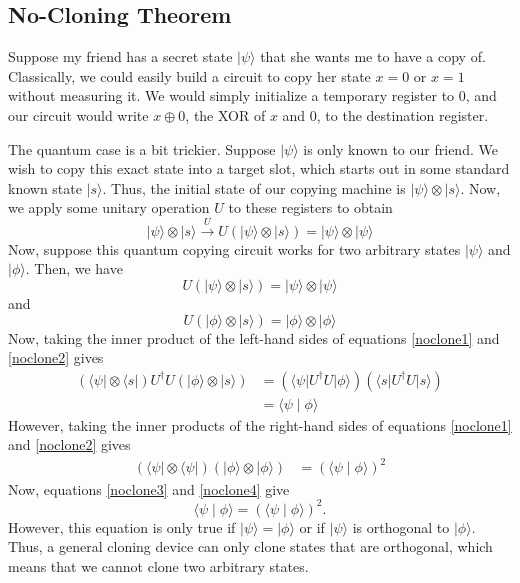 \documentclass[12pt,twoside]{reedthesis}
\theoremstyle{definition}
\newlength{\arrow}
\newcommand{\ket}[1]{\ensuremath{\lvert #1\rangle}\xspace}
\newcommand{\bra}[1]{\ensuremath{\langle #1\vert}\xspace}
\newcommand{\inner}[2]{\ensuremath{\langle #1 \mid #2 \rangle}\xspace}
\begin{document}
\subsection{No-Cloning Theorem}

Suppose my friend has a secret state \ket{\psi} that she wants me to have a copy of.  Classically, we could easily build a circuit to copy her state $x = 0$ or $x = 1$ without measuring it. We would simply initialize a temporary register to 0, and our circuit would write $x \oplus 0$, the XOR of $x$ and 0, to the destination register. 

The quantum case is a bit trickier. Suppose \ket{\psi} is only known to our friend. We wish to copy this exact state into a target slot, which starts out in some standard known state \ket{s}. Thus, the initial state of our copying machine is $\ket{\psi} \otimes \ket{s}$. Now, we apply some unitary operation $U$ to these registers to obtain
\begin{equation}
\ket{\psi} \otimes \ket{s} \xrightarrow{U} U(\ket{\psi} \otimes \ket{s}) = \ket{\psi} \otimes \ket{\psi}
\end{equation}
Now, suppose this quantum copying circuit works for two arbitrary states \ket{\psi} and \ket{\phi}. Then, we have
\begin{equation} \label{noclone1}
U(\ket{\psi} \otimes \ket{s}) = \ket{\psi} \otimes \ket{\psi}
\end{equation}
and
\begin{equation} \label{noclone2}
U(\ket{\phi} \otimes \ket{s}) = \ket{\phi} \otimes \ket{\phi}
\end{equation}
Now, taking the inner product of the left-hand sides of equations \ref{noclone1} and \ref{noclone2} gives
\begin{align} 
(\bra{\psi} \otimes \bra{s})U^{\dagger}U (\ket{\phi} \otimes \ket{s})
& = (\bra{\psi} U^\dagger U \ket{\phi})(\bra{s} U^\dagger U \ket{s}) \\
& = \inner{\psi}{\phi} \label{noclone3}
\end{align}
However, taking the inner products of the right-hand sides of equations \ref{noclone1} and \ref{noclone2} gives
\begin{align} \label{noclone4}
(\bra{\psi} \otimes \bra{\psi})(\ket{\phi} \otimes \ket{\phi})
& = (\inner{\psi}{\phi})^2
\end{align}
Now, equations \ref{noclone3} and \ref{noclone4} give
\begin{equation*}
 \inner{\psi}{\phi} = (\inner{\psi}{\phi})^2.
\end{equation*}
However, this equation is only true if $\ket{\psi} = \ket{\phi}$ or if $\ket{\psi}$ is orthogonal to $\ket{\phi}$. Thus, a general cloning device can only clone states that are orthogonal, which means that we cannot clone two arbitrary states.
\end{document}
